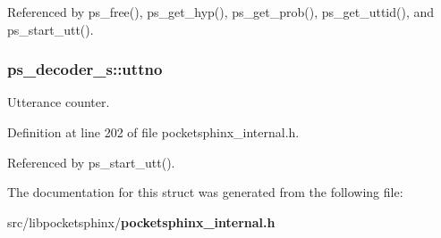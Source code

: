 \-Referenced by ps\-\_\-free(), ps\-\_\-get\-\_\-hyp(), ps\-\_\-get\-\_\-prob(), ps\-\_\-get\-\_\-uttid(), and ps\-\_\-start\-\_\-utt().

\subsubsection[{uttno}]{ {\bf ps\-\_\-decoder\-\_\-s\-::uttno}}\label{structps__decoder__s_a0f597370dd162c2799efe216c9b991fc}


\-Utterance counter. 



\-Definition at line 202 of file pocketsphinx\-\_\-internal.\-h.



\-Referenced by ps\-\_\-start\-\_\-utt().



\-The documentation for this struct was generated from the following file\-:\begin{DoxyCompactItemize}
\item 
src/libpocketsphinx/{\bf pocketsphinx\-\_\-internal.\-h}\end{DoxyCompactItemize}
